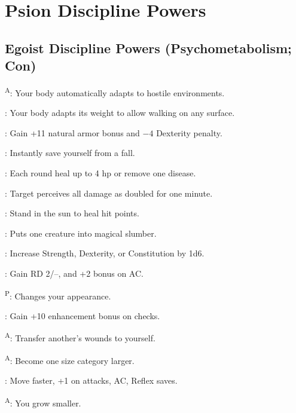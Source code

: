 \section{Psion Discipline Powers}



\subsection{Egoist Discipline Powers {\normalsize(Psychometabolism; Con)}}
\begin{enumerate*}
\item {}\textsuperscript{A}: Your body automatically adapts to hostile environments.

      : Your body adapts its weight to allow walking on any surface.

      : Gain +11 natural armor bonus and $-4$ Dexterity penalty.

      : Instantly save yourself from a fall. %

      : Each round heal up to 4 hp or remove one disease.

      : Target perceives all damage as doubled for one minute.

      : Stand in the sun to heal hit points.

      : Puts one creature into magical slumber.

\item {}: Increase Strength, Dexterity, or Constitution by 1d6.

      : Gain RD 2/--, and +2 bonus on AC.

      \textsuperscript{P}: Changes your appearance.

      : Gain +10 enhancement bonus on  checks. %

      \textsuperscript{A}: Transfer another's wounds to yourself. %

      \textsuperscript{A}: Become one size category larger. %

      : Move faster, +1 on attacks, AC, Reflex saves.

      \textsuperscript{A}: You grow smaller. %


\end{enumerate*}
